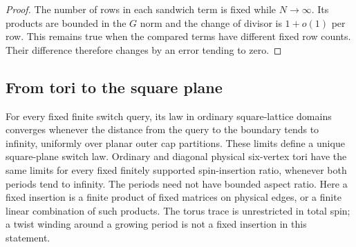 \begin{proof}
The number of rows in each sandwich term is fixed while
\(N\to\infty\). Its products are bounded in the \(G\) norm and
the change of divisor is \(1+o(1)\) per row. This remains true when
the compared terms have different fixed row counts. Their difference
therefore changes by an error tending to zero.
\end{proof}

\subsection{From tori to the square plane}

\begin{proposition}
\label{prop:plane-limit}
For every fixed finite switch query, its law in ordinary square-lattice
domains converges whenever the distance from the query to the boundary
tends to infinity, uniformly over planar outer cap partitions.  These
limits define a unique square-plane switch law.  Ordinary and diagonal physical
six-vertex tori have the same limits for every fixed finitely
supported spin-insertion ratio, whenever both periods tend to
infinity. The periods need not have bounded aspect ratio.
Here a fixed insertion is a finite product of fixed matrices on
physical edges, or a finite linear combination of such products.
The torus trace is unrestricted in total spin; a twist winding around
a growing period is not a fixed insertion in this statement.
\end{proposition}

